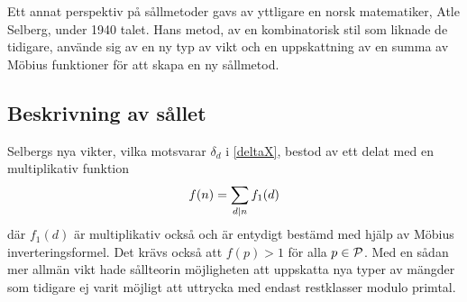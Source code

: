 Ett annat perspektiv på sållmetoder gavs av yttligare en norsk matematiker, Atle Selberg, under 1940 talet. 
Hans metod, av en kombinatorisk stil som liknade de tidigare, använde sig av en ny typ av vikt och en uppskattning av en summa av Möbius funktioner för att skapa en ny sållmetod.

\subsection{Beskrivning av sållet}
Selbergs nya vikter, vilka motsvarar \(\delta_d\) i \eqref{deltaX}, bestod av ett delat med en multiplikativ funktion 
\begin{equation}
    f(n) = \sum_{d\divides n}f_1(d)\nonumber
\end{equation}
där \(f_1(d)\) är  multiplikativ också och är entydigt bestämd med hjälp av Möbius inverteringsformel. Det krävs också att \(f(p) > 1\) för alla \(p\in\P\). 
Med en sådan mer allmän vikt hade sållteorin möjligheten att uppskatta nya typer av mängder som tidigare ej varit möjligt att uttrycka med endast restklasser modulo primtal. 

